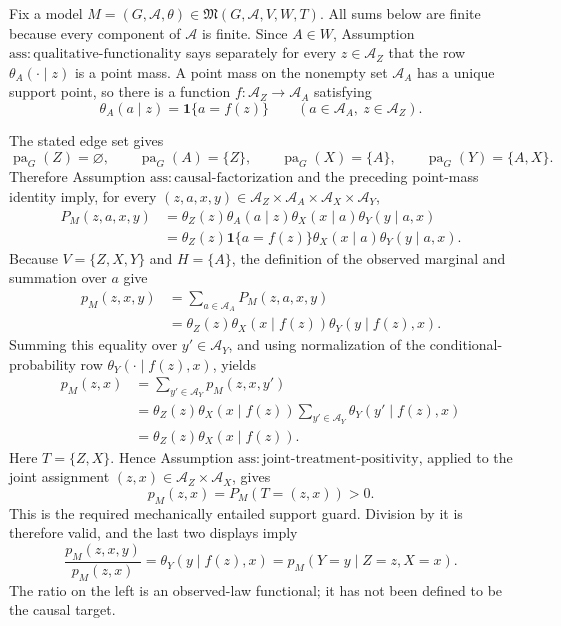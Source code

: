 Fix a model \(M=(G,\mathcal A,\theta)\in\mathfrak M(G,\mathcal A,V,W,T)\).  All sums below are finite because every component of \(\mathcal A\) is finite.  Since \(A\in W\), Assumption \(\mathrm{ass:qualitative\text{-}functionality}\) says separately for every \(z\in\mathcal A_Z\) that the row \(\theta_A(\cdot\mid z)\) is a point mass.  A point mass on the nonempty set \(\mathcal A_A\) has a unique support point, so there is a function \(f:\mathcal A_Z\to\mathcal A_A\) satisfying
\[
 \theta_A(a\mid z)=\mathbf 1\{a=f(z)\}
 \qquad
 (a\in\mathcal A_A,\ z\in\mathcal A_Z).
\]

The stated edge set gives
\[
 \operatorname{pa}_G(Z)=\varnothing,
 \qquad
 \operatorname{pa}_G(A)=\{Z\},
 \qquad
 \operatorname{pa}_G(X)=\{A\},
 \qquad
 \operatorname{pa}_G(Y)=\{A,X\}.
\]
Therefore Assumption \(\mathrm{ass:causal\text{-}factorization}\) and the preceding point-mass identity imply, for every \((z,a,x,y)\in\mathcal A_Z\times\mathcal A_A\times\mathcal A_X\times\mathcal A_Y\),
\[
\begin{aligned}
 P_M(z,a,x,y)
 &=\theta_Z(z)\theta_A(a\mid z)\theta_X(x\mid a)\theta_Y(y\mid a,x)\\
 &=\theta_Z(z)\mathbf 1\{a=f(z)\}\theta_X(x\mid a)\theta_Y(y\mid a,x).
\end{aligned}
\]
Because \(V=\{Z,X,Y\}\) and \(H=\{A\}\), the definition of the observed marginal and summation over \(a\) give
\[
\begin{aligned}
 p_M(z,x,y)
 &=\sum_{a\in\mathcal A_A}P_M(z,a,x,y)\\
 &=\theta_Z(z)\theta_X(x\mid f(z))\theta_Y(y\mid f(z),x).
\end{aligned}
\]
Summing this equality over \(y'\in\mathcal A_Y\), and using normalization of the conditional-probability row \(\theta_Y(\cdot\mid f(z),x)\), yields
\[
\begin{aligned}
 p_M(z,x)
 &=\sum_{y'\in\mathcal A_Y}p_M(z,x,y')\\
 &=\theta_Z(z)\theta_X(x\mid f(z))
   \sum_{y'\in\mathcal A_Y}\theta_Y(y'\mid f(z),x)\\
 &=\theta_Z(z)\theta_X(x\mid f(z)).
\end{aligned}
\]
Here \(T=\{Z,X\}\).  Hence Assumption \(\mathrm{ass:joint\text{-}treatment\text{-}positivity}\), applied to the joint assignment \((z,x)\in\mathcal A_Z\times\mathcal A_X\), gives
\[
 p_M(z,x)=P_M(T=(z,x))>0.
\]
This is the required mechanically entailed support guard.  Division by it is therefore valid, and the last two displays imply
\[
 \frac{p_M(z,x,y)}{p_M(z,x)}
 =\theta_Y(y\mid f(z),x)
 =p_M(Y=y\mid Z=z,X=x).
\]
The ratio on the left is an observed-law functional; it has not been defined to be the causal target.

